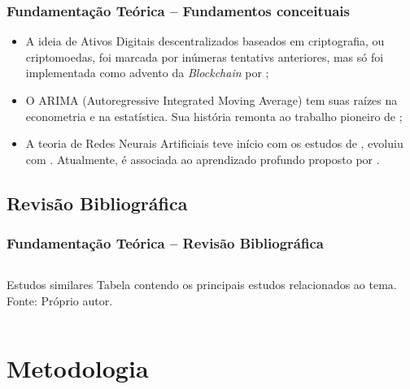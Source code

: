 \documentclass[aspectratio=169]{beamer}
\begin{document}
\begin{frame}[fragile] \frametitle{Fundamentação Teórica -- Fundamentos conceituais}
	\begin{itemize} \itemsep1em
		\item A ideia de Ativos Digitais descentralizados baseados em criptografia, ou criptomoedas, foi marcada por inúmeras tentativs anteriores, mas só foi implementada como advento da \textit{Blockchain} por \cite{Nakamoto} \cite{Moi};
		\item O ARIMA (Autoregressive Integrated Moving Average) tem suas raízes na econometria e na estatística. Sua história remonta ao trabalho pioneiro de \textcite{Box};
		\item A teoria de Redes Neurais Artificiais teve início com os estudos de \textcite{Rosenblatt}, evoluiu com \textcite{Rumelhart}. Atualmente, é associada ao aprendizado profundo proposto por \textcite{Good}.
	\end{itemize}
\end{frame}

\subsection{Revisão Bibliográfica}
\begin{frame}[fragile] 
    \frametitle{Fundamentação Teórica -- Revisão Bibliográfica}
    \begin{columns}[c]
		\begin{column}{1\linewidth}
			\begin{figure}
				\label{fig:estudos}
			\end{figure}

			\begin{block}{Estudos similares}
				Tabela contendo os principais estudos relacionados ao tema. Fonte: Próprio autor.    
			\end{block}
		\end{column}
	\end{columns}
\end{frame}


\section{Metodologia}
\end{document}
